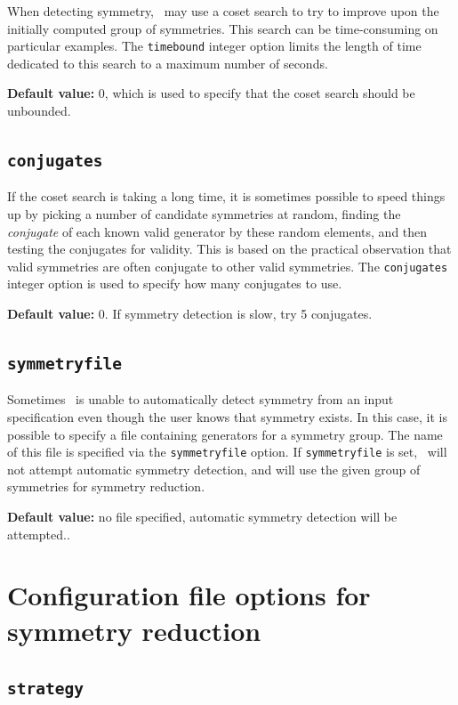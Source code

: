 When detecting symmetry, \topspin\ may use a coset search to try to improve upon the initially computed group of symmetries.  This search
can be time-consuming on particular examples.  The \texttt{timebound} integer option limits the length of time dedicated to this search to a maximum
number of seconds.

\noindent\textbf{Default value: } 0, which is used to specify that the coset search should be unbounded.

\subsection{\texttt{conjugates}}

If the coset search is taking a long time, it is sometimes possible to speed things up by picking a number of candidate symmetries
at random, finding the \emph{conjugate} of each known valid generator by these random elements, and then testing the conjugates for
validity.  This is based on the practical observation that valid symmetries are often conjugate to other valid symmetries.  The
\texttt{conjugates} integer option is used to specify how many conjugates to use.

\noindent\textbf{Default value: } 0.  If symmetry detection is slow, try 5 conjugates.

\subsection{\texttt{symmetryfile}}

Sometimes \topspin\ is unable to automatically detect symmetry from an input specification even though the user knows that symmetry exists.
In this case, it is possible to specify a file containing generators for a symmetry group.  The name of this file is specified via the
\texttt{symmetryfile} option.  If \texttt{symmetryfile} is set, \topspin\ will not attempt automatic symmetry detection, and will use the
given group of symmetries for symmetry reduction.

\noindent\textbf{Default value: } no file specified, automatic symmetry detection will be attempted..

\section{Configuration file options for symmetry reduction}\label{sec:overview:symmetryreductionconfig}

\subsection{\texttt{strategy}}

